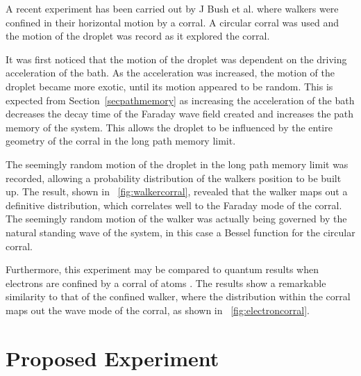 \documentclass[11pt]{article}
\newcommand{\figref}[2][\figurename~]{#1\ref{#2}}
\newcommand{\secref}[2][Section~]{#1\ref{#2}}
\begin{document}
A recent experiment has been carried out by J Bush et al. \cite{12} where walkers were confined in their horizontal motion by a corral.  A circular corral was used and the motion of the droplet was record as it explored the corral.

It was first noticed that the motion of the droplet was dependent on the driving acceleration of the bath.  As the acceleration was increased, the motion of the droplet became more exotic, until its motion appeared to be random.  This is expected from \secref{secpathmemory} as increasing the acceleration of the bath decreases the decay time of the Faraday wave field created and increases the path memory of the system.  This allows the droplet to be influenced by the entire geometry of the corral in the long path memory limit.

The seemingly random motion of the droplet in the long path memory limit was recorded, allowing a probability distribution of the walkers position to be built up.  The result, shown in \figref{fig:walkercorral}, revealed that the walker maps out a definitive distribution, which correlates well to the Faraday mode of the corral.  The seemingly random motion of the walker was actually being governed by the natural standing wave of the system, in this case a Bessel function for the circular corral.

Furthermore, this experiment may be compared to quantum results when electrons are confined by a corral of atoms \cite{21}.  The results show a remarkable similarity to that of the confined walker, where the distribution within the corral maps out the wave mode of the corral, as shown in \figref{fig:electroncorral}.


\section{Proposed Experiment}
\label{sec:proposedexperiment}
\end{document}
